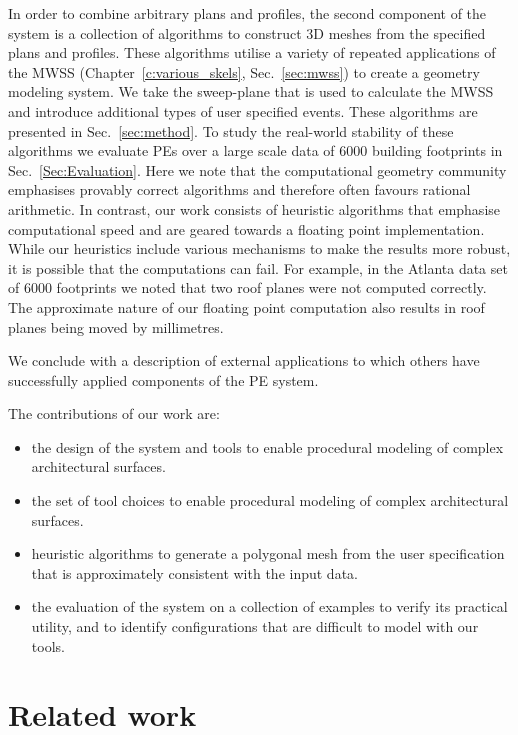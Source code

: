 In order to combine arbitrary plans and profiles, the second component of the system is a collection of algorithms to construct 3D meshes from the specified plans and profiles. These algorithms utilise a variety of repeated applications of the MWSS (Chapter~\ref{c:various_skels}, Sec.~\ref{sec:mwss}) to create a geometry modeling system. We take the sweep-plane that is used to calculate the MWSS and introduce additional types of user specified events. These algorithms are presented in Sec.~\ref{sec:method}. To study the real-world stability of these algorithms we evaluate PEs over a large scale data of $6000$ building footprints in Sec.~\ref{Sec:Evaluation}. Here we note that the computational geometry community emphasises provably correct algorithms and therefore often favours rational arithmetic. In contrast, our work consists of heuristic algorithms that emphasise computational speed and are geared towards a floating point implementation. While our heuristics include various mechanisms to make the results more robust, it is possible that the computations can fail. For example, in the Atlanta data set of $6000$ footprints we noted that two roof planes were not computed correctly. The approximate nature of our floating point computation also results in roof planes being moved by millimetres.

We conclude  with a description of external applications to which others have successfully applied components of the PE system.

The contributions of our work are:
\begin{itemize}
\item the design of the system and tools to enable procedural modeling of complex architectural surfaces.
\item the set of tool choices to enable procedural modeling of complex architectural surfaces.
\item heuristic algorithms to generate a polygonal mesh from the user specification that is approximately consistent with the input data.
\item the evaluation of the system on a collection of examples to verify its practical utility, and to identify configurations that are difficult to model with our tools.
\end{itemize}


\section{Related work}
\label{sec:alternatives}

